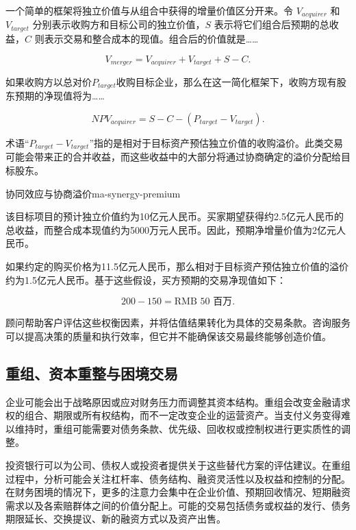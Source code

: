 一个简单的框架将独立价值与从组合中获得的增量价值区分开来。令 $V_{acquirer}$ 和 $V_{target}$ 分别表示收购方和目标公司的独立价值，$S$ 表示将它们组合后预期的总收益，$C$ 则表示交易和整合成本的现值。组合后的价值就是……

\begin{equation}
V_{merger}=V_{acquirer}+V_{target}+S-C.
\label{eq:ch13-combined-transaction-value}
\end{equation}

如果收购方以总对价$P_{target}$收购目标企业，那么在这一简化框架下，收购方现有股东预期的净现值将为……

\begin{equation}
\textit{NPV}_{acquirer}=S-C-(P_{target}-V_{target}).
\label{eq:ch13-acquirer-transaction-npv}
\end{equation}

术语“$P_{target}-V_{target}$”指的是相对于目标资产预估独立价值的收购溢价。此类交易可能会带来正的合并收益，而这些收益中的大部分将通过协商确定的溢价分配给目标股东。

\begin{example}{协同效应与协商溢价}{ma-synergy-premium}

该目标项目的预计独立价值约为10亿元人民币。买家期望获得约2.5亿元人民币的总收益，而整合成本现值约为5000万元人民币。因此，预期净增量价值为2亿元人民币。

如果约定的购买价格为11.5亿元人民币，那么相对于目标资产预估独立价值的溢价约为1.5亿元人民币。基于这些假设，买方预期的交易净现值如下：

\[
200-150=\text{RMB }50\text{ 百万}.
\]

\end{example}

顾问帮助客户评估这些权衡因素，并将估值结果转化为具体的交易条款。咨询服务可以提高决策的质量和执行效率，但它并不能确保该交易最终能够创造价值。

\subsection{重组、资本重整与困境交易}

企业可能会出于战略原因或应对财务压力而调整其资本结构。重组会改变金融请求权的组合、期限或所有权结构，而不一定改变企业的运营资产。当支付义务变得难以维持时，重组可能需要对债务条款、优先级、回收权或控制权进行更实质性的调整。

投资银行可以为公司、债权人或投资者提供关于这些替代方案的评估建议。在重组过程中，分析可能会关注杠杆率、债务结构、融资灵活性以及权益和控制的分配。在财务困境的情况下，更多的注意力会集中在企业价值、预期回收情况、短期融资需求以及各索赔群体之间的价值分配上。可能的交易包括债务或权益的发行、债务期限延长、交换提议、新的融资方式以及资产出售。

